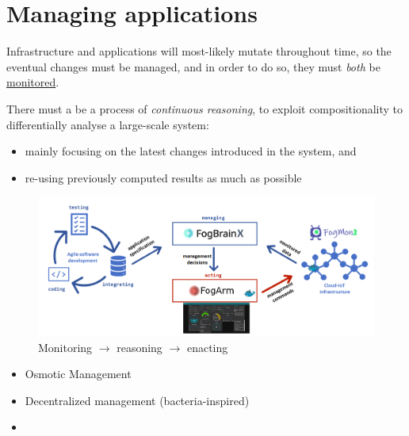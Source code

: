 \section{Managing applications}
Infrastructure and applications will most-likely mutate throughout time,
so the eventual changes must be managed, and in order to do so,
they must \textit{both} be \underline{monitored}.

There must a be a process of \textit{continuous reasoning}, to exploit compositionality to differentially analyse a large-scale system:
\begin{itemize}
   \item mainly focusing on the latest changes introduced in the system,
   and
   \item re-using previously computed results as much as possible
\end{itemize}

\begin{figure}[htbp]
   \centering
   \includegraphics{images/edge_reasoning.png}
   \caption{Monitoring $\longrightarrow$ reasoning $\longrightarrow$ enacting}
   \label{fig:edge_reasoning}
\end{figure}

\begin{itemize}
   \item Osmotic Management
   \item Decentralized management (bacteria-inspired)
   \item 
\end{itemize}